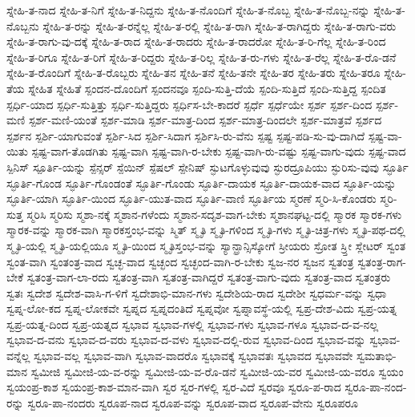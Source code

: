 {ಸ್ನೇಹಿ-ತ-ನಾದ
ಸ್ನೇಹಿ-ತ-ನಿಗೆ
ಸ್ನೇಹಿ-ತ-ನಿದ್ದನು
ಸ್ನೇಹಿ-ತ-ನೊಂದಿಗೆ
ಸ್ನೇಹಿ-ತ-ನೊಬ್ಬ
ಸ್ನೇಹಿ-ತ-ನೊಬ್ಬ-ನನ್ನು
ಸ್ನೇಹಿ-ತ-ನೊಬ್ಬನು
ಸ್ನೇಹಿ-ತ-ರನ್ನು
ಸ್ನೇಹಿ-ತ-ರನ್ನೆಲ್ಲ
ಸ್ನೇಹಿ-ತ-ರಲ್ಲಿ
ಸ್ನೇಹಿ-ತ-ರಾಗಿ
ಸ್ನೇಹಿ-ತ-ರಾಗಿದ್ದರು
ಸ್ನೇಹಿ-ತ-ರಾಗು-ವರು
ಸ್ನೇಹಿ-ತ-ರಾಗು-ವು-ದಕ್ಕೆ
ಸ್ನೇಹಿ-ತ-ರಾದ
ಸ್ನೇಹಿ-ತ-ರಾದರು
ಸ್ನೇಹಿ-ತ-ರಾದರೋ
ಸ್ನೇಹಿ-ತ-ರಿ-ಗೆಲ್ಲ
ಸ್ನೇಹಿ-ತ-ರಿಂದ
ಸ್ನೇಹಿ-ತ-ರಿಗೂ
ಸ್ನೇಹಿ-ತ-ರಿಗೆ
ಸ್ನೇಹಿ-ತ-ರಿದ್ದರು
ಸ್ನೇಹಿ-ತ-ರಿಲ್ಲ
ಸ್ನೇಹಿ-ತ-ರು-ಗಳು
ಸ್ನೇಹಿ-ತ-ರೆಲ್ಲ
ಸ್ನೇಹಿ-ತ-ರೊ-ಡನೆ
ಸ್ನೇಹಿ-ತ-ರೊಂದಿಗೆ
ಸ್ನೇಹಿ-ತ-ರೊಬ್ಬರು
ಸ್ನೇಹಿ-ತನ
ಸ್ನೇಹಿ-ತನೆ
ಸ್ನೇಹಿ-ತನೇ
ಸ್ನೇಹಿ-ತರ
ಸ್ನೇಹಿ-ತರು
ಸ್ನೇಹಿ-ತರೂ
ಸ್ನೇಹಿ-ತೆಯ
ಸ್ನೇಹಿತ
ಸ್ನೇಹಿತೆ
ಸ್ಪಂದನ-ದೊಂದಿಗೆ
ಸ್ಪಂದನವೂ
ಸ್ಪಂದಿ-ಸುತ್ತಿ-ದೆಯೆ
ಸ್ಪಂದಿ-ಸುತ್ತಿದೆ
ಸ್ಪಂದಿ-ಸುತ್ತಿದ್ದ
ಸ್ಪಂದಿತ
ಸ್ಪರ್ಧಿ-ಯಾದ
ಸ್ಪರ್ಧಿ-ಸುತ್ತಿತ್ತು
ಸ್ಪರ್ಧಿ-ಸುತ್ತಿದ್ದರು
ಸ್ಪರ್ಧಿಸ-ಬೇ-ಕಾದರೆ
ಸ್ಪರ್ಧೆ
ಸ್ಪರ್ಧೆಯೇ
ಸ್ಪರ್ಶ
ಸ್ಪರ್ಶ-ದಿಂದ
ಸ್ಪರ್ಶ-ಮಣಿ
ಸ್ಪರ್ಶ-ಮಣಿ-ಯಂತೆ
ಸ್ಪರ್ಶ-ಮಾಡಿ
ಸ್ಪರ್ಶ-ಮಾತ್ರ-ದಿಂದ
ಸ್ಪರ್ಶ-ಮಾತ್ರ-ದಿಂದಲೇ
ಸ್ಪರ್ಶ-ಮಾತ್ರವೆ
ಸ್ಪರ್ಶದ
ಸ್ಪರ್ಶನ
ಸ್ಪರ್ಶಿ-ಯಾಗುವಂತೆ
ಸ್ಪರ್ಶಿ-ಸಿದ
ಸ್ಪರ್ಶಿ-ಸಿದಾಗ
ಸ್ಪರ್ಶಿಸಿ-ರು-ವೆನು
ಸ್ಪಷ್ಟ
ಸ್ಪಷ್ಟ-ಪಡಿ-ಸು-ವು-ದಾಗಿದೆ
ಸ್ಪಷ್ಟ-ವಾ-ಯಿತು
ಸ್ಪಷ್ಟ-ವಾಗ-ತೊಡಗಿತು
ಸ್ಪಷ್ಟ-ವಾಗಿ
ಸ್ಪಷ್ಟ-ವಾಗಿ-ರ-ಬೇಕು
ಸ್ಪಷ್ಟ-ವಾಗಿ-ರು-ವಷ್ಟು
ಸ್ಪಷ್ಟ-ವಾಗು-ವುದು
ಸ್ಪಷ್ಟ-ವಾದ
ಸ್ಪಿನಿಸ್
ಸ್ಪೂರ್ತಿ-ಯನ್ನು
ಸ್ಪೆನ್ಸರ್
ಸ್ಪೆಯಿನ್
ಸ್ಪೆಷಲ್
ಸ್ಪೇನಿಷ್
ಸ್ಫುಟಗೊಳ್ಳುವುವು
ಸ್ಫುರದ್ರೂಪಿಯು
ಸ್ಫುರಿಸು-ವುವು
ಸ್ಫೂರ್ತಿ
ಸ್ಫೂರ್ತಿ-ಗೊಂಡ
ಸ್ಫೂರ್ತಿ-ಗೊಂಡಂತೆ
ಸ್ಫೂರ್ತಿ-ಗೊಂಡು
ಸ್ಫೂರ್ತಿ-ದಾಯಕ
ಸ್ಫೂರ್ತಿ-ದಾಯಕ-ವಾದ
ಸ್ಫೂರ್ತಿ-ಯನ್ನು
ಸ್ಫೂರ್ತಿ-ಯಾಗಿ
ಸ್ಫೂರ್ತಿ-ಯಿಂದ
ಸ್ಫೂರ್ತಿ-ಯುತ-ವಾದ
ಸ್ಫೂರ್ತಿ-ವಾಣಿ
ಸ್ಫೂರ್ತಿಯ
ಸ್ಮರಣೆ
ಸ್ಮರಿ-ಸಿ-ಕೊಂಡರು
ಸ್ಮರಿ-ಸುತ್ತ
ಸ್ಮರಿಸಿ
ಸ್ಮರಿಸು
ಸ್ಮಶಾ-ನಕ್ಕೆ
ಸ್ಮಶಾನ-ಗಳೆಂದು
ಸ್ಮಶಾನ-ಸದೃಶ-ವಾಗ-ಬೇಕು
ಸ್ಮಶಾನಘಟ್ಟ-ದಲ್ಲಿ
ಸ್ಮಾರಕ
ಸ್ಮಾರಕ-ಗಳು
ಸ್ಮಾರಕ-ವನ್ನು
ಸ್ಮಾರಕ-ವಾಗಿ
ಸ್ಮಾರಕಸ್ತಂಭ-ವನ್ನು
ಸ್ಮಿತ್
ಸ್ಮೃತಿ
ಸ್ಮೃತಿ-ಗಳಿಂದ
ಸ್ಮೃತಿ-ಗಳು
ಸ್ಮೃತಿ-ಚಿತ್ರ-ಗಳು
ಸ್ಮೃತಿ-ಪಥ-ದಲ್ಲಿ
ಸ್ಮೃತಿ-ಯಲ್ಲಿ
ಸ್ಮೃತಿ-ಯಲ್ಲಿಯೂ
ಸ್ಮೃತಿ-ಯಿಂದ
ಸ್ಮೃತಿಸ್ತಂಭ-ವನ್ನು
ಸ್ಯಾನ್ಫ್ರಾನ್ಸಿಸ್ಕೋಗೆ
ಸ್ರೀಯರು
ಸ್ರೋತ
ಸ್ರ್ತೀ
ಸ್ಲೇಟರ್
ಸ್ವಂತ
ಸ್ವಂತ-ವಾಗಿ
ಸ್ವಂತಂತ್ರ-ವಾದ
ಸ್ವಚ್ಛ-ವಾದ
ಸ್ವಚ್ಛಂದ
ಸ್ವಚ್ಛಂದ-ವಾಗಿ-ರ-ಬೇಕು
ಸ್ವಜ-ನರ
ಸ್ವಜನ
ಸ್ವತಂತ್ರ
ಸ್ವತಂತ್ರ-ರಾಗ-ಬೇಕೆ
ಸ್ವತಂತ್ರ-ವಾಗ-ಲಾ-ರದು
ಸ್ವತಂತ್ರ-ವಾಗಿ
ಸ್ವತಂತ್ರ-ವಾಗಿದ್ದರೆ
ಸ್ವತಂತ್ರ-ವಾಗು-ವುದು
ಸ್ವತಂತ್ರ-ವಾದ
ಸ್ವತಂತ್ರರು
ಸ್ವತಃ
ಸ್ವದೇಶ
ಸ್ವದೇಶ-ವಾಸಿ-ಗ-ಳಿಗೆ
ಸ್ವದೇಶಾಭಿ-ಮಾನ-ಗಳು
ಸ್ವದೇಶಿಯ-ರಾದ
ಸ್ವದೇಶೀ
ಸ್ವಧರ್ಮ-ವನ್ನು
ಸ್ವಧಾ
ಸ್ವಪ್ನ-ಲೋ-ಕದ
ಸ್ವಪ್ನ-ಲೋಕವೇ
ಸ್ವಪ್ನದ
ಸ್ವಪ್ನದಂತಿದೆ
ಸ್ವಪ್ನವೋ
ಸ್ವಪ್ನಾವಸ್ಥೆ-ಯಲ್ಲಿ
ಸ್ವಪ್ರ-ದೇಶ-ವಿದು
ಸ್ವಪ್ರ-ಯತ್ನ
ಸ್ವಪ್ರ-ಯತ್ನ-ದಿಂದ
ಸ್ವಪ್ರ-ಯತ್ನದ
ಸ್ವಭಾವ
ಸ್ವಭಾವ-ಗಳಲ್ಲಿ
ಸ್ವಭಾವ-ಗಳು
ಸ್ವಭಾವ-ಗಳೂ
ಸ್ವಭಾವ-ದ-ವ-ನಲ್ಲ
ಸ್ವಭಾವ-ದ-ವನು
ಸ್ವಭಾವ-ದ-ವರು
ಸ್ವಭಾವ-ದ-ವಳು
ಸ್ವಭಾವ-ದಲ್ಲಿ-ರುವ
ಸ್ವಭಾವ-ದಿಂದ
ಸ್ವಭಾವ-ವನ್ನು
ಸ್ವಭಾವ-ವನ್ನೆಲ್ಲ
ಸ್ವಭಾವ-ವಲ್ಲ
ಸ್ವಭಾವ-ವಾಗಿ
ಸ್ವಭಾವ-ವಾದರೊ
ಸ್ವಭಾವಕ್ಕೆ
ಸ್ವಭಾವತಃ
ಸ್ವಭಾವದ
ಸ್ವಭಾವವೇ
ಸ್ವಮತಾಭಿ-ಮಾನ
ಸ್ವಮೀಜಿ
ಸ್ವಮೀಜಿ-ಯ-ವ-ರನ್ನು
ಸ್ವಮೀಜಿ-ಯ-ವ-ರೊ-ಡನೆ
ಸ್ವಮೀಜಿ-ಯ-ವರ
ಸ್ವಮೀಜಿ-ಯ-ವರೂ
ಸ್ವಯಂ
ಸ್ವಯಂಪ್ರ-ಕಾಶ
ಸ್ವಯಂಪ್ರ-ಕಾಶ-ಮಾನ-ವಾಗಿ
ಸ್ವರ
ಸ್ವರ-ಗಳಲ್ಲಿ
ಸ್ವರ-ವಿದೆ
ಸ್ವರವೂ
ಸ್ವರೂ-ಪ-ರಾದ
ಸ್ವರೂ-ಪಾ-ನಂದ-ರನ್ನು
ಸ್ವರೂ-ಪಾ-ನಂದರು
ಸ್ವರೂಪ-ನಾದ
ಸ್ವರೂಪ-ವನ್ನು
ಸ್ವರೂಪ-ವಾದ
ಸ್ವರೂಪ-ವೇನು
ಸ್ವರೂಪರೂ
}
